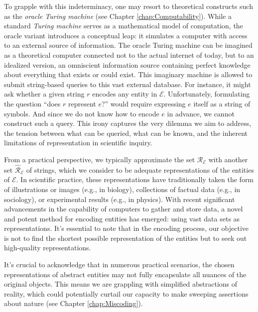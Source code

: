 To grapple with this indeterminacy, one may resort to theoretical constructs such as the \emph{oracle Turing machine} (see Chapter \ref{chap:Computability}). While a standard \emph{Turing machine} serves as a mathematical model of computation, the oracle variant introduces a conceptual leap: it simulates a computer with access to an external source of information. The oracle Turing machine can be imagined as a theoretical computer connected not to the actual internet of today, but to an idealized version, an omniscient information source containing perfect knowledge about everything that exists or could exist. This imaginary machine is allowed to submit string-based queries to this vast external database. For instance, it might ask whether a given string $r$ encodes any entity in $\mathcal{E}$. Unfortunately, formulating the question “does $r$ represent $e$?” would require expressing $e$ itself as a string of symbols. And since we do not know how to encode $e$ in advance, we cannot construct such a query. This irony captures the very dilemma we aim to address, the tension between what can be queried, what can be known, and the inherent limitations of representation in scientific inquiry.

From a practical perspective, we typically approximate the set $\mathcal{R}_\mathcal{E}$ with another set $\hat{\mathcal{R}}_\mathcal{E}$ of strings, which we consider to be adequate representations of the entities of $\mathcal{E}$. In scientific practice, these representations have traditionally taken the form of illustrations or images (e.g., in biology), collections of factual data (e.g., in sociology), or experimental results (e.g., in physics). With recent significant advancements in the capability of computers to gather and store data, a novel and potent method for encoding entities has emerged: using vast data sets as representations. It's essential to note that in the encoding process, our objective is not to find the shortest possible representation of the entities but to seek out high-quality representations.

It's crucial to acknowledge that in numerous practical scenarios, the chosen representations of abstract entities may not fully encapsulate all nuances of the original objects. This means we are grappling with simplified abstractions of reality, which could potentially curtail our capacity to make sweeping assertions about nature (see Chapter \ref{chap:Miscoding}).

